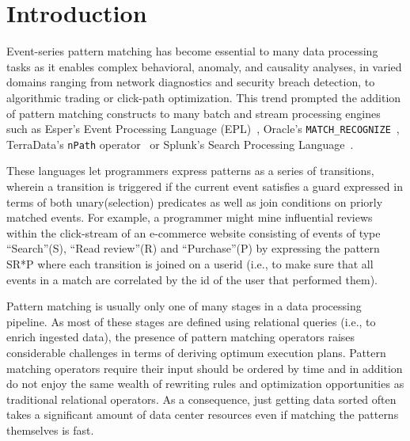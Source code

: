 \section{Introduction}


Event-series pattern matching has become essential to many data processing tasks
as it enables complex behavioral, anomaly, and causality analyses, in varied
domains ranging from network diagnostics and security breach detection, to
algorithmic trading or click-path optimization.  This trend prompted the
addition of pattern matching constructs to many batch and stream processing
engines such as Esper's Event Processing Language (EPL)~\cite{esper_epl},
Oracle's \texttt{MATCH\_RECOGNIZE}~\cite{oracle_mr}, TerraData's \texttt{nPath}
operator~\cite{aster_npath} or Splunk's Search Processing
Language~\cite{Carasso:2012}.

These languages let programmers express patterns as a series of transitions,
wherein a transition 
is triggered if the current event satisfies a guard expressed in terms of both 
unary(selection) predicates as well as join conditions on priorly matched 
events. 
For example, a programmer might mine
influential reviews within the click-stream of an e-commerce website consisting
of events of type ``Search''(S), ``Read review''(R) and ``Purchase''(P) by
expressing the pattern SR*P where each transition is joined on a userid (i.e.,
to make sure that all events in a match are correlated by the id of the user 
that performed them).

Pattern matching is usually only one of many stages in a data processing
pipeline.  As most of these stages are defined using relational queries (i.e.,
to enrich ingested data), the presence of pattern matching operators raises
considerable challenges in terms of deriving optimum execution plans.  Pattern
matching operators require their input should be ordered by time and in
addition do not enjoy the same wealth of rewriting rules and optimization
opportunities as traditional relational operators.  As a consequence, just
getting data sorted often takes a significant amount of data center resources
even if matching the patterns themselves is fast.

